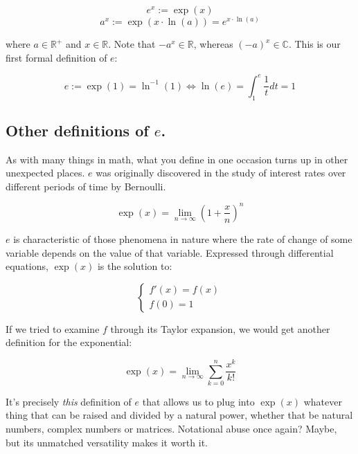 $$e^x := \exp(x)$$
$$a^x := \exp(x\cdot \ln(a)) = e^{x\cdot \ln(a)}$$

where $a\in \mathbb{R}^+$ and $x\in \mathbb{R}$. Note that $-a^x \in \mathbb{R}$, whereas $(-a)^x \in \mathbb{C}$. This is our first formal definition of $e$:

$$e := \exp(1) = \ln^{-1}(1) \iff \ln(e) = \int_{1}^{e} \frac{1}{t} dt = 1$$

\subsection{Other definitions of $e$.}

As with many things in math, what you define in one occasion turns up in other unexpected places. $e$ was originally discovered in the study of interest rates over different periods of time by Bernoulli.

$$\exp(x) = \lim_{n \to \infty} \left(1 + \frac{x}{n}\right)^n$$

$e$ is characteristic of those phenomena in nature where the rate of change of some variable depends on the value of that variable. Expressed through differential equations, $\exp(x)$ is the solution to:

\begin{equation}
	\begin{cases}
		f'(x) = f(x) \\
		f(0) = 1
	\end{cases}
\end{equation}

If we tried to examine $f$ through its Taylor expansion, we would get another definition for the exponential:

$$\exp(x) = \lim_{n \to \infty} \sum\limits_{k = 0}^{n} \frac{x^k}{k!}$$

It's precisely \textit{this} definition of $e$ that allows us to plug into $\exp(x)$ whatever thing that can be raised and divided by a natural power, whether that be natural numbers, complex numbers or matrices. Notational abuse once again? Maybe, but its unmatched versatility makes it worth it.

\newpage
